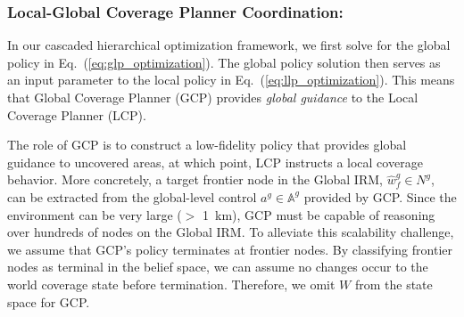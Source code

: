 \documentclass[letterpaper]{article} %
\newcommand{\phdone}[1]{} %
\begin{document}
\subsubsection{Local-Global Coverage Planner Coordination:} \hfill
\vspace{-0.25pt}

\noindent
In our cascaded hierarchical optimization framework, we first solve for the global policy in Eq.~(\ref{eq:glp_optimization}). The global policy solution then serves as an input parameter to the local policy in Eq.~(\ref{eq:llp_optimization}). This means that Global Coverage Planner (GCP) provides \textit{global guidance} to the Local Coverage Planner (LCP).





The role of GCP is to construct a low-fidelity policy that provides global guidance to uncovered areas, at which point, LCP instructs a local coverage behavior. More concretely, a target frontier node in the Global IRM, $\hat{w}^g_f \in N^g$, can be extracted from the global-level control $a^g \in \mathbb{A}^g$ provided by GCP. Since the environment can be very large ($>$ 1~km), GCP must be capable of reasoning over hundreds of nodes on the Global IRM. To alleviate this scalability challenge, we assume that GCP's policy terminates at frontier nodes. By classifying frontier nodes as terminal in the belief space, we can assume no changes occur to the world coverage state before termination. Therefore, we omit $W$ from the state space for GCP.
% 
\end{document}

